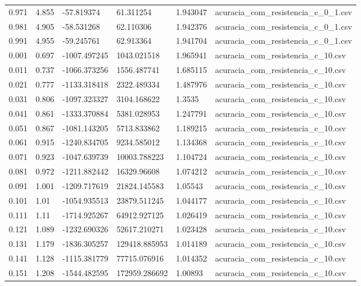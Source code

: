 \begin{table}
\begin{tabular}{llllll}
0.971 & 4.855 & -57.819374 & 61.311254 & 1.943047 & acuracia\_com\_resistencia\_c\_0\_1.csv \\
0.981 & 4.905 & -58.531268 & 62.110306 & 1.942376 & acuracia\_com\_resistencia\_c\_0\_1.csv \\
0.991 & 4.955 & -59.245761 & 62.913364 & 1.941704 & acuracia\_com\_resistencia\_c\_0\_1.csv \\
0.001 & 0.697 & -1007.497245 & 1043.021518 & 1.965941 & acuracia\_com\_resistencia\_c\_10.csv \\
0.011 & 0.737 & -1066.373256 & 1556.487741 & 1.685115 & acuracia\_com\_resistencia\_c\_10.csv \\
0.021 & 0.777 & -1133.318418 & 2322.489334 & 1.487976 & acuracia\_com\_resistencia\_c\_10.csv \\
0.031 & 0.806 & -1097.323327 & 3104.168622 & 1.3535 & acuracia\_com\_resistencia\_c\_10.csv \\
0.041 & 0.861 & -1333.370884 & 5381.028953 & 1.247791 & acuracia\_com\_resistencia\_c\_10.csv \\
0.051 & 0.867 & -1081.143205 & 5713.833862 & 1.189215 & acuracia\_com\_resistencia\_c\_10.csv \\
0.061 & 0.915 & -1240.834705 & 9234.585012 & 1.134368 & acuracia\_com\_resistencia\_c\_10.csv \\
0.071 & 0.923 & -1047.639739 & 10003.788223 & 1.104724 & acuracia\_com\_resistencia\_c\_10.csv \\
0.081 & 0.972 & -1211.882442 & 16329.96608 & 1.074212 & acuracia\_com\_resistencia\_c\_10.csv \\
0.091 & 1.001 & -1209.717619 & 21824.145583 & 1.05543 & acuracia\_com\_resistencia\_c\_10.csv \\
0.101 & 1.01 & -1054.935513 & 23879.511245 & 1.044177 & acuracia\_com\_resistencia\_c\_10.csv \\
0.111 & 1.11 & -1714.925267 & 64912.927125 & 1.026419 & acuracia\_com\_resistencia\_c\_10.csv \\
0.121 & 1.089 & -1232.690326 & 52617.210271 & 1.023428 & acuracia\_com\_resistencia\_c\_10.csv \\
0.131 & 1.179 & -1836.305257 & 129418.885953 & 1.014189 & acuracia\_com\_resistencia\_c\_10.csv \\
0.141 & 1.128 & -1115.381779 & 77715.076916 & 1.014352 & acuracia\_com\_resistencia\_c\_10.csv \\
0.151 & 1.208 & -1544.482595 & 172959.286692 & 1.00893 & acuracia\_com\_resistencia\_c\_10.csv \\

\end{tabular}
\end{table}

